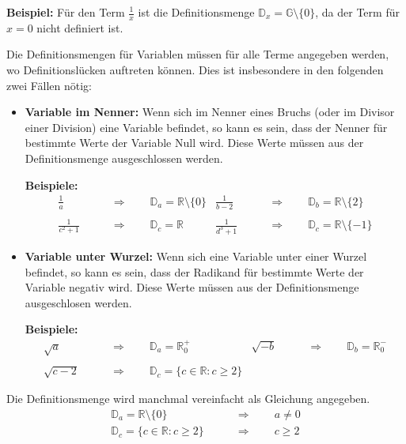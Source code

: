 \begin{example}
  \textbf{Beispiel:} Für den Term $\displaystyle \frac{1}{x}$ ist die Definitionsmenge $\mathbb{D}_{x} = \mathbb{G} \setminus \{0\}$, da der Term für $x = 0$ nicht definiert ist.
\end{example}

Die Definitionsmengen für Variablen müssen für alle Terme angegeben werden, wo Definitionslücken auftreten können. Dies ist insbesondere in den folgenden zwei Fällen nötig:

\begin{itemize}
\item \textbf{Variable im Nenner:} Wenn sich im Nenner eines Bruchs (oder im Divisor einer Division) eine Variable befindet, so kann es sein, dass der Nenner für bestimmte Werte der Variable Null wird. Diese Werte müssen aus der Definitionsmenge ausgeschlossen werden.
  \begin{example}
    \textbf{Beispiele:}
    \begin{align*}
      \frac{1}{a} \qquad&\Rightarrow\qquad \mathbb{D}_a = \mathbb{R} \setminus \{0\} &
      \frac{1}{b-2} \qquad&\Rightarrow\qquad \mathbb{D}_b = \mathbb{R} \setminus \{2\} \\\\
      \frac{1}{c^{2}+1} \qquad&\Rightarrow\qquad \mathbb{D}_c = \mathbb{R} & \frac{1}{d^{3}+1} \qquad&\Rightarrow\qquad \mathbb{D}_c = \mathbb{R} \setminus \{-1\}
    \end{align*}
  \end{example}

  \item \textbf{Variable unter Wurzel:} Wenn sich eine Variable unter einer Wurzel befindet, so kann es sein, dass der Radikand für bestimmte Werte der Variable negativ wird. Diese Werte müssen aus der Definitionsmenge ausgeschlosen werden.
  \begin{example}
    \textbf{Beispiele:}
    \begin{align*}
      \sqrt{a}   \qquad&\Rightarrow\qquad \mathbb{D}_a = \mathbb{R}_{0}^{+} &
      \sqrt{-b}  \qquad&\Rightarrow\qquad \mathbb{D}_b = \mathbb{R}_{0}^{-} \\\\
      \sqrt{c-2} \qquad&\Rightarrow\qquad \mathbb{D}_c = \{c \in \mathbb{R} : c \ge 2 \}
    \end{align*}
  \end{example}
\end{itemize}

Die Definitionsmenge wird manchmal vereinfacht als Gleichung angegeben.
\begin{align*}
  \mathbb{D}_a = \mathbb{R} \setminus \{0\} \qquad&\Rightarrow\qquad a \ne 0 \\
  \mathbb{D}_c = \{c \in \mathbb{R} : c \ge 2 \} \qquad&\Rightarrow\qquad c \ge 2 \\
\end{align*}
